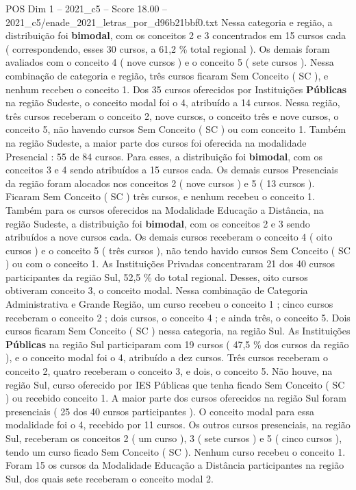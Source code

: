\begin{textsample}{POS Dim 1 – 2021\_c5 – Score 18.00 – 2021\_c5/enade\_2021\_letras\_por\_d96b21bbf0.txt}
Nessa categoria e região, a distribuição foi \textbf{bimodal}, com os conceitos 2 e 3 concentrados em 15 cursos cada ( correspondendo, esses 30 cursos, a 61,2 \% total regional ).
Os demais foram avaliados com o conceito 4 ( nove cursos ) e o conceito 5 ( sete cursos ).
Nessa combinação de categoria e região, três cursos ficaram Sem Conceito ( SC ), e nenhum recebeu o conceito 1.
Dos 35 cursos oferecidos por Instituições \textbf{Públicas} na região Sudeste, o conceito modal foi o 4, atribuído a 14 cursos.
Nessa região, três cursos receberam o conceito 2, nove cursos, o conceito três e nove cursos, o conceito 5, não havendo cursos Sem Conceito ( SC ) ou com conceito 1.
Também na região Sudeste, a maior parte dos cursos foi oferecida na modalidade Presencial : 55 de 84 cursos.
Para esses, a distribuição foi \textbf{bimodal}, com os conceitos 3 e 4 sendo atribuídos a 15 cursos cada.
Os demais cursos Presenciais da região foram alocados nos conceitos 2 ( nove cursos ) e 5 ( 13 cursos ).
Ficaram Sem Conceito ( SC ) três cursos, e nenhum recebeu o conceito 1.
Também para os cursos oferecidos na Modalidade Educação a Distância, na região Sudeste, a distribuição foi \textbf{bimodal}, com os conceitos 2 e 3 sendo atribuídos a nove cursos cada.
Os demais cursos receberam o conceito 4 ( oito cursos ) e o conceito 5 ( três cursos ), não tendo havido cursos Sem Conceito ( SC ) ou com o conceito 1.
As Instituições Privadas concentraram 21 dos 40 cursos participantes da região Sul, 52,5 \% do total regional.
Desses, oito cursos obtiveram conceito 3, o conceito modal.
Nessa combinação de Categoria Administrativa e Grande Região, um curso recebeu o conceito 1 ; cinco cursos receberam o conceito 2 ; dois cursos, o conceito 4 ; e ainda três, o conceito 5.
Dois cursos ficaram Sem Conceito ( SC ) nessa categoria, na região Sul.
As Instituições \textbf{Públicas} na região Sul participaram com 19 cursos ( 47,5 \% dos cursos da região ), e o conceito modal foi o 4, atribuído a dez cursos.
Três cursos receberam o conceito 2, quatro receberam o conceito 3, e dois, o conceito 5.
Não houve, na região Sul, curso oferecido por IES Públicas que tenha ficado Sem Conceito ( SC ) ou recebido conceito 1.
A maior parte dos cursos oferecidos na região Sul foram presenciais ( 25 dos 40 cursos participantes ).
O conceito modal para essa modalidade foi o 4, recebido por 11 cursos.
Os outros cursos presenciais, na região Sul, receberam os conceitos 2 ( um curso ), 3 ( sete cursos ) e 5 ( cinco cursos ), tendo um curso ficado Sem Conceito ( SC ).
Nenhum curso recebeu o conceito 1.
Foram 15 os cursos da Modalidade Educação a Distância participantes na região Sul, dos quais sete receberam o conceito modal 2.

\end{textsample}
